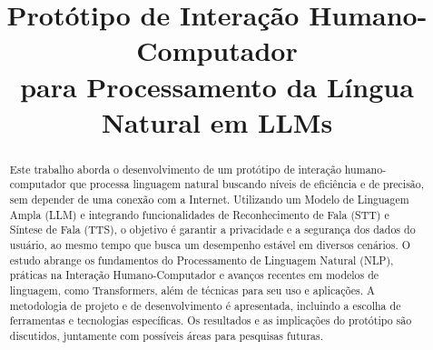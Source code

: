 \documentclass[10pt, conference, compsocconf]{IEEEtran}
\begin{document}
\title{Protótipo de Interação Humano-Computador\\ para Processamento da Língua Natural em LLMs}

\author{
}

\maketitle

\begin{abstract}


Este trabalho aborda o desenvolvimento de um protótipo de interação humano-computador que processa linguagem natural buscando níveis de  eficiência e de precisão,%
sem depender de uma conexão com a Internet.
Utilizando um Modelo de Linguagem Ampla (LLM) e integrando funcionalidades de Reconhecimento de Fala (STT) e Síntese de Fala (TTS), o objetivo é garantir a privacidade e a segurança dos dados do usuário, ao mesmo tempo que busca um desempenho estável em diversos cenários. O estudo abrange os fundamentos do Processamento de Linguagem Natural (NLP), práticas na Interação Humano-Computador e avanços recentes em modelos de linguagem, como Transformers, além de técnicas para seu uso e aplicações. A metodologia de projeto e de desenvolvimento é apresentada, incluindo a escolha de ferramentas e tecnologias específicas. Os resultados e as implicações do protótipo são discutidos, juntamente com possíveis áreas para pesquisas futuras.

\end{abstract}
\end{document}
